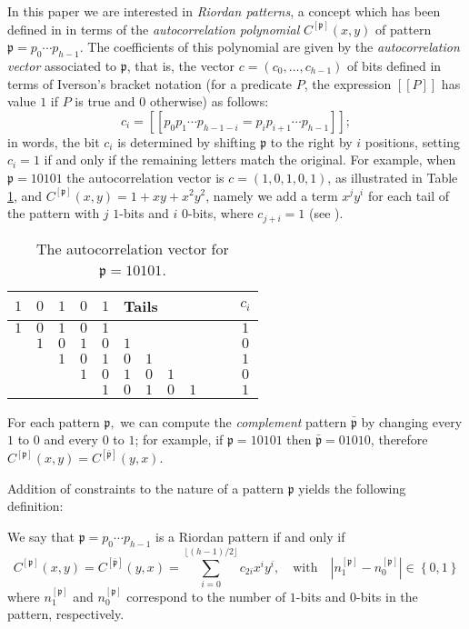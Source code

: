In this paper we are interested in \textit{Riordan patterns}, a concept which
has been defined in \cite{MS11} in terms of the \textit{autocorrelation
polynomial} $C^{[\mathfrak{p}]}(x,y)$ of pattern $\mathfrak{p}=p_{0}\cdots
p_{h-1}$. The coefficients of this polynomial are given by the
\textit{autocorrelation vector} associated to $\mathfrak{p}$, that is, the
vector $c=(c_0,\ldots ,c_{h-1})$ of bits defined in terms of Iverson's bracket
notation (for a predicate $P$, the expression $[\![P]\!]$ has value $1$ if $P$
is true and $0$ otherwise) as follows:
$$c_i=[\![p_0p_1\cdots p_{h-1-i}=p_{i}p_{i+1}\cdots p_{h-1}]\!];$$
in words, the bit $c_i$ is determined by shifting $\mathfrak{p}$ to the right by
$i$ positions, setting $c_i=1$ if and only if the remaining letters match the
original. For example, when $\mathfrak{p}= 10101$ the autocorrelation vector is
$c=(1,0,1,0,1)$, as illustrated in Table \ref{auto}, and
$C^{[\mathfrak{p}]}(x,y)=1+xy+x^2y^2$, namely we add a term $x^jy^i$ for each
tail of the pattern with $j$ $1$-bits  and $i$ $0$-bits, where $c_{j+i}=1$ (see
\cite{GO80,GO81,SF96}).
\begin{table}
    \begin{center}
        \begin{tabular}{ccccc|ccccccc}
          $1$ & $0$ & $1$ & $0$& $1$ &   \multicolumn{6}{l}{Tails} & $c_{i}$  \\
          \hline
          $1$ & $0$ & $1$ & $0$ & $1$ & &   &   &   &   &   &    $1$ \\
            & $1$ & $0$ & $1$ & $0$ & $1$ &  &   &   &   &   &    $0$ \\
            &   & $1$ & $0$ & $1$ & $0$ & $1$ &  &   &   &   &    $1$ \\
            &   &   & $1$ & $0$ & $1$ & $0$ & $1$ &  &   &   &    $0$ \\
            &   &   &   & $1$ & $0$ & $1$ & $0$ & $1$ &  &   &    $1$ \\
        \end{tabular}
    \end{center}
\caption{\label{auto}The autocorrelation vector for  $\mathfrak{p}= 10101$.}
\end{table}
For each pattern $\mathfrak{p},$  we can compute the \textit{complement} pattern
$\mathfrak{\bar{p}}$  by changing every $1$ to $0$ and every $0$ to $1$; for
example, if $\mathfrak{p}= 10101$ then $\mathfrak{\bar{p}}=01010$, therefore
$C^{[\mathfrak{p}]}(x,y)=C^{[\mathfrak{\bar{p}}]}(y,x)$.

Addition of constraints to the nature of a pattern $\mathfrak{p}$ yields
the following definition:
\begin{defi}
\label{defrp}
We say that $\mathfrak{p}=p_0\cdots p_{h-1}$ is a Riordan pattern if and only
if
\begin{displaymath}
C^{[\mathfrak{p}]}(x,y)=C^{[\mathfrak{\bar{p}}]}(y,x)=\sum_{i=0}^{\lfloor(h-1)/2\rfloor}c_{2i}x^iy^i,
\quad \mbox{with} \quad |n_1^{[\mathfrak{p}]}-n_0^{[\mathfrak{p}]}|\in
\left\{0,1 \right\}
\end{displaymath}
where $n_1^{[\mathfrak{p}]}$ and  $n_0^{[\mathfrak{p}]}$ correspond to the
number of $1$-bits  and $0$-bits  in the pattern, respectively.
\end{defi}

